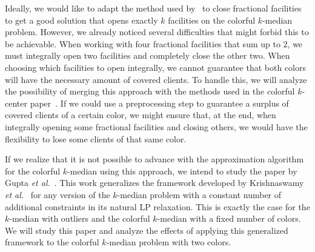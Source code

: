 Ideally, we would like to adapt the method used by~\cite{KLS2018} to close fractional facilities to get a good solution that opens exactly $k$ facilities on the colorful $k$-median problem. However, we already noticed several difficulties that might forbid this to be achievable. When working with four fractional facilities that sum up to $2$, we must integrally open two facilities and completely close the other two. When choosing which facilities to open integrally, we cannot guarantee that both colors will have the necessary amount of covered clients. To handle this, we will analyze the possibility of merging this approach with the methods used in the colorful $k$-center paper~\cite{JSS2020}. If we could use a preprocessing step to guarantee a surplus of covered clients of a certain color, we might ensure that, at the end, when integrally opening some fractional facilities and closing others, we would have the flexibility to lose some clients of that same color.

If we realize that it is not possible to advance with the approximation algorithm for the colorful $k$-median using this approach, we intend to study the paper by Gupta \emph{et al.}~\cite{GMZ2021}. This work generalizes the framework developed by Krishnaswamy \emph{et al.}~\cite{KLS2018} for any version of the $k$-median problem with a constant number of additional constraints in its natural LP relaxation. This is exactly the case for the $k$-median with outliers and the colorful $k$-median with a fixed number of colors. We will study this paper and analyze the effects of applying this generalized framework to the colorful $k$-median problem with two colors.
